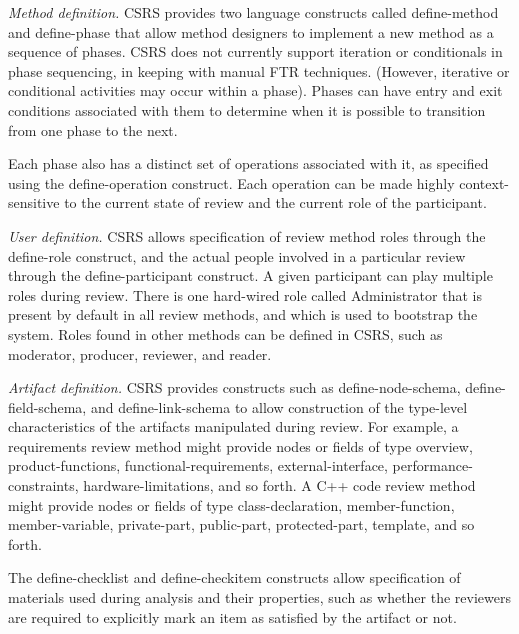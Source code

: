 \begin{itemizenoindent}

\item {\em Method definition.}  CSRS provides two language constructs
  called {\sf\small define-method} and {\sf\small define-phase} that allow method
  designers to implement a new method as a sequence of phases.  CSRS does
  not currently support iteration or conditionals in phase sequencing, in
  keeping with manual FTR techniques. (However, iterative or conditional
  activities may occur within a phase).  Phases can have entry and exit
  conditions associated with them to determine when it is possible to
  transition from one phase to the next.

  Each phase also has a distinct set of operations associated with it, as
  specified using the {\sf\small define-operation} construct.  Each operation
  can be made highly context-sensitive to the current state of review and
  the current role of the participant.

\item {\em User definition.}  CSRS allows specification of review method
  roles through the {\sf\small define-role} construct, and the actual people
  involved in a particular review through the {\sf\small define-participant}
  construct.  A given participant can play multiple roles during review.
  There is one hard-wired role called Administrator that is present by
  default in all review methods, and which is used to bootstrap the
  system.  Roles found in other methods can be defined in CSRS, such as
  moderator, producer, reviewer, and reader.  

\item {\em Artifact definition.}  CSRS provides constructs such as {\sf\small
  define-node-schema}, {\sf\small define-field-schema}, and {\sf\small
  define-link-schema} to allow construction of the type-level
  characteristics of the artifacts manipulated during review.  For
  example, a requirements review method might provide nodes or fields of
  type overview, product-functions, functional-requirements,
  external-interface, performance-constraints, hardware-limitations, and
  so forth. A C++ code review method might provide nodes or fields of
  type class-declaration, member-function, member-variable, private-part,
  public-part, protected-part, template, and so forth.

  The {\sf\small define-checklist} and {\sf\small define-checkitem} constructs allow
  specification of materials used during analysis and their properties,
  such as whether the reviewers are required to explicitly mark an item as
  satisfied by the artifact or not.


\end{itemizenoindent}
